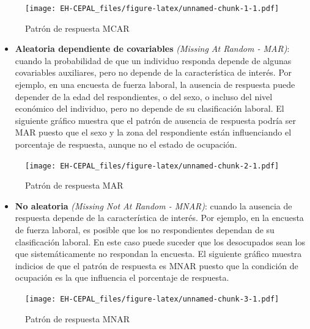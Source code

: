 \documentclass[12pt,spanish,]{book}
\providecommand{\tightlist}{%
  \setlength{\itemsep}{0pt}\setlength{\parskip}{0pt}}
\begin{document}
\begin{figure}
\centering
\texttt{[image: EH-CEPAL\_files/figure-latex/unnamed-chunk-1-1.pdf]}
\caption{\label{fig:unnamed-chunk-1}Patrón de respuesta MCAR}
\end{figure}

\begin{itemize}
\tightlist
\item
  \textbf{Aleatoria dependiente de covariables} \emph{(Missing At Random - MAR)}: cuando la probabilidad de que un individuo responda depende de algunas covariables auxiliares, pero no depende de la característica de interés. Por ejemplo, en una encuesta de fuerza laboral, la ausencia de respuesta puede depender de la edad del respondientes, o del sexo, o incluso del nivel económico del individuo, pero no depende de su clasificación laboral. El siguiente gráfico muestra que el patrón de ausencia de respuesta podría ser MAR puesto que el sexo y la zona del respondiente están influenciando el porcentaje de respuesta, aunque no el estado de ocupación.
\end{itemize}

\begin{figure}
\centering
\texttt{[image: EH-CEPAL\_files/figure-latex/unnamed-chunk-2-1.pdf]}
\caption{\label{fig:unnamed-chunk-2}Patrón de respuesta MAR}
\end{figure}

\begin{itemize}
\tightlist
\item
  \textbf{No aleatoria} \emph{(Missing Not At Random - MNAR)}: cuando la ausencia de respuesta depende de la característica de interés. Por ejemplo, en la encuesta de fuerza laboral, es posible que los no respondientes dependan de su clasificación laboral. En este caso puede suceder que los desocupados sean los que sistemáticamente no respondan la encuesta. El siguiente gráfico muestra indicios de que el patrón de respuesta es MNAR puesto que la condición de ocupación es la que influencia el porcentaje de respuesta.
\end{itemize}

\begin{figure}
\centering
\texttt{[image: EH-CEPAL\_files/figure-latex/unnamed-chunk-3-1.pdf]}
\caption{\label{fig:unnamed-chunk-3}Patrón de respuesta MNAR}
\end{figure}
\end{document}
